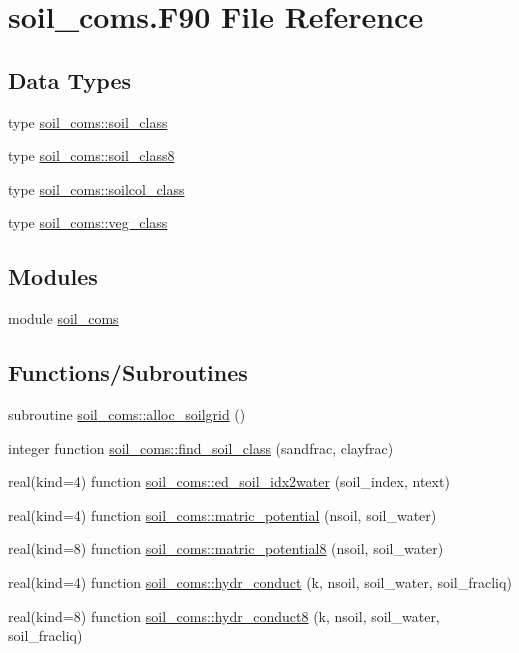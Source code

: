 \hypertarget{soil__coms_8_f90}{}\section{soil\+\_\+coms.\+F90 File Reference}
\label{soil__coms_8_f90}
\subsection*{Data Types}
\begin{DoxyCompactItemize}
\item 
type \hyperlink{structsoil__coms_1_1soil__class}{soil\+\_\+coms\+::soil\+\_\+class}
\item 
type \hyperlink{structsoil__coms_1_1soil__class8}{soil\+\_\+coms\+::soil\+\_\+class8}
\item 
type \hyperlink{structsoil__coms_1_1soilcol__class}{soil\+\_\+coms\+::soilcol\+\_\+class}
\item 
type \hyperlink{structsoil__coms_1_1veg__class}{soil\+\_\+coms\+::veg\+\_\+class}
\end{DoxyCompactItemize}
\subsection*{Modules}
\begin{DoxyCompactItemize}
\item 
module \hyperlink{namespacesoil__coms}{soil\+\_\+coms}
\end{DoxyCompactItemize}
\subsection*{Functions/\+Subroutines}
\begin{DoxyCompactItemize}
\item 
subroutine \hyperlink{namespacesoil__coms_ad616d97c9e0bec81cd93be86cd178216}{soil\+\_\+coms\+::alloc\+\_\+soilgrid} ()
\item 
integer function \hyperlink{namespacesoil__coms_af8e155e8412b0de0b7b1aa35463611e6}{soil\+\_\+coms\+::find\+\_\+soil\+\_\+class} (sandfrac, clayfrac)
\item 
real(kind=4) function \hyperlink{namespacesoil__coms_af338b81aceade9a67dff90cf850e5cc6}{soil\+\_\+coms\+::ed\+\_\+soil\+\_\+idx2water} (soil\+\_\+index, ntext)
\item 
real(kind=4) function \hyperlink{namespacesoil__coms_ac656cda53ab267fd2e927c65359524fd}{soil\+\_\+coms\+::matric\+\_\+potential} (nsoil, soil\+\_\+water)
\item 
real(kind=8) function \hyperlink{namespacesoil__coms_a7c1fb8a910aaa86ed2ec34257db6e5e3}{soil\+\_\+coms\+::matric\+\_\+potential8} (nsoil, soil\+\_\+water)
\item 
real(kind=4) function \hyperlink{namespacesoil__coms_a465d9c7443ba25dad5afd0f2fe6d8cae}{soil\+\_\+coms\+::hydr\+\_\+conduct} (k, nsoil, soil\+\_\+water, soil\+\_\+fracliq)
\item 
real(kind=8) function \hyperlink{namespacesoil__coms_aa4131e33c26dc4f026bca85034eba1b9}{soil\+\_\+coms\+::hydr\+\_\+conduct8} (k, nsoil, soil\+\_\+water, soil\+\_\+fracliq)
\end{DoxyCompactItemize}
